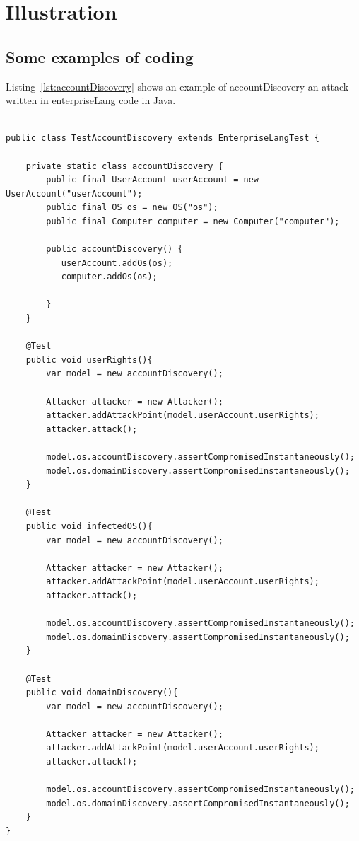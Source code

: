 \documentclass[english]{kththesis}
\begin{document}
\clearpage
\section{Illustration}
\label{sec:illustration}

\subsection{Some examples of coding}

Listing~\ref{lst:accountDiscovery} shows an example of accountDiscovery an attack written in enterpriseLang code in Java.

\begin{lstlisting}[caption={accountDiscovery attack}, label=lst:accountDiscovery]

public class TestAccountDiscovery extends EnterpriseLangTest {

    private static class accountDiscovery {
        public final UserAccount userAccount = new UserAccount("userAccount");
        public final OS os = new OS("os");
        public final Computer computer = new Computer("computer");
        
        public accountDiscovery() {
           userAccount.addOs(os);
           computer.addOs(os); 

        }
    }

    @Test
    public void userRights(){
        var model = new accountDiscovery();

        Attacker attacker = new Attacker();
        attacker.addAttackPoint(model.userAccount.userRights);
        attacker.attack();

        model.os.accountDiscovery.assertCompromisedInstantaneously();
        model.os.domainDiscovery.assertCompromisedInstantaneously();
    }

    @Test
    public void infectedOS(){
        var model = new accountDiscovery();

        Attacker attacker = new Attacker();
        attacker.addAttackPoint(model.userAccount.userRights);
        attacker.attack();

        model.os.accountDiscovery.assertCompromisedInstantaneously();
        model.os.domainDiscovery.assertCompromisedInstantaneously();
    }

    @Test
    public void domainDiscovery(){
        var model = new accountDiscovery();

        Attacker attacker = new Attacker();
        attacker.addAttackPoint(model.userAccount.userRights);
        attacker.attack();
        
        model.os.accountDiscovery.assertCompromisedInstantaneously();
        model.os.domainDiscovery.assertCompromisedInstantaneously();
    }
}
\end{lstlisting}
\end{document}
